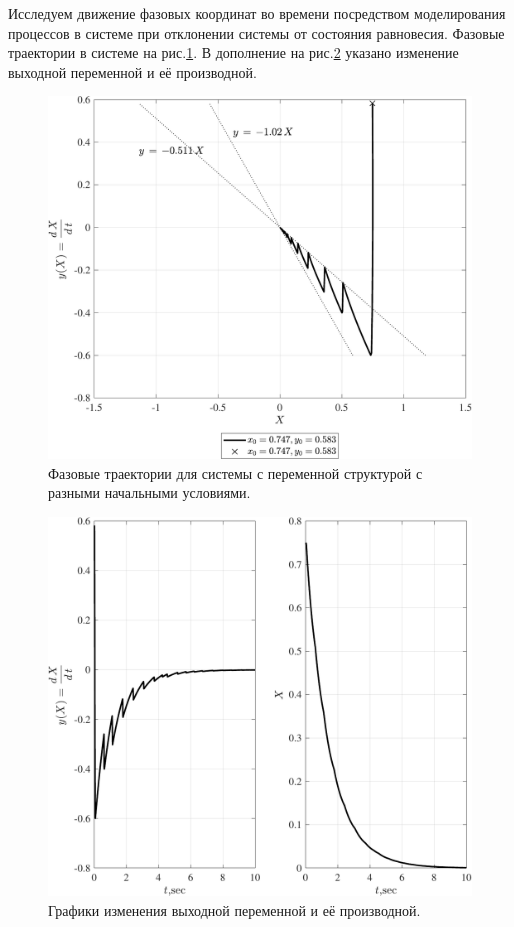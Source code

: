 Исследуем движение фазовых координат во времени посредством моделирования процессов в системе при отклонении системы от состояния равновесия. Фазовые траектории в системе на рис.\ref{fig:VSS_steady_degenerate_motion_ft_SLM}. 
В дополнение на рис.\ref{fig:VSS_steady_degenerate_motion_sv_SLM} указано изменение выходной переменной и её производной. 
\begin{figure}[!h]\centering
\includegraphics[width=1.0\linewidth]{images/VSS_steady_degenerate_motion_ft_SLM}
\caption{ Фазовые траектории для системы с переменной структурой с разными начальными условиями.}\label{fig:VSS_steady_degenerate_motion_ft_SLM}
\end{figure}
\begin{figure}[!h]\centering
\includegraphics[width=1.0\linewidth]{images/VSS_steady_degenerate_motion_sv_SLM}
\caption{ Графики изменения выходной переменной и её производной.}\label{fig:VSS_steady_degenerate_motion_sv_SLM}
\end{figure}

